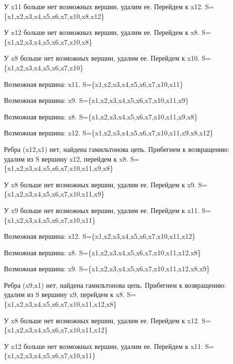 \documentclass{article}
\begin{document}
У x11 больше нет возможных вершин, удалим ее. Перейдем к x12. S=\{x1,x2,x3,x4,x5,x6,x7,x10,x8,x12\}



У x12 больше нет возможных вершин, удалим ее. Перейдем к x8. S=\{x1,x2,x3,x4,x5,x6,x7,x10,x8\}



У x8 больше нет возможных вершин, удалим ее. Перейдем к x10. S=\{x1,x2,x3,x4,x5,x6,x7,x10\}



Возможная вершина: x11. S=\{x1,x2,x3,x4,x5,x6,x7,x10,x11\}



Возможная вершина: x9. S=\{x1,x2,x3,x4,x5,x6,x7,x10,x11,x9\}



Возможная вершина: x8. S=\{x1,x2,x3,x4,x5,x6,x7,x10,x11,x9,x8\}



Возможная вершина: x12. S=\{x1,x2,x3,x4,x5,x6,x7,x10,x11,x9,x8,x12\}



Ребра (x12,x1) нет, найдена гамильтонова цепь. Прибегнем к возвращению: удалим из S вершину x12, перейдем к x8. S=\{x1,x2,x3,x4,x5,x6,x7,x10,x11,x9,x8\}



У x8 больше нет возможных вершин, удалим ее. Перейдем к x9. S=\{x1,x2,x3,x4,x5,x6,x7,x10,x11,x9\}



У x9 больше нет возможных вершин, удалим ее. Перейдем к x11. S=\{x1,x2,x3,x4,x5,x6,x7,x10,x11\}



Возможная вершина: x12. S=\{x1,x2,x3,x4,x5,x6,x7,x10,x11,x12\}



Возможная вершина: x8. S=\{x1,x2,x3,x4,x5,x6,x7,x10,x11,x12,x8\}



Возможная вершина: x9. S=\{x1,x2,x3,x4,x5,x6,x7,x10,x11,x12,x8,x9\}



Ребра (x9,x1) нет, найдена гамильтонова цепь. Прибегнем к возвращению: удалим из S вершину x9, перейдем к x8. S=\{x1,x2,x3,x4,x5,x6,x7,x10,x11,x12,x8\}



У x8 больше нет возможных вершин, удалим ее. Перейдем к x12. S=\{x1,x2,x3,x4,x5,x6,x7,x10,x11,x12\}



У x12 больше нет возможных вершин, удалим ее. Перейдем к x11. S=\{x1,x2,x3,x4,x5,x6,x7,x10,x11\}
\end{document}
